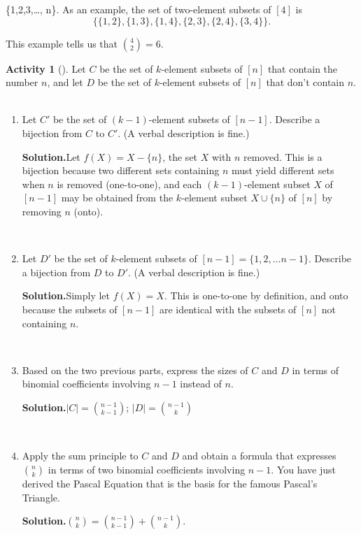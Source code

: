 \documentclass[10pt,]{book}
\theoremstyle{plain}
\theoremstyle{definition}
\newtheorem{activity}[project]{Activity}
\numberwithin{equation}{chapter}
\begin{document}
\{1,2,3,\ldots, n\}\). As an example, the set of two-element subsets of \([4]\) is%
\begin{equation*}
\{\{1,2\}, \{1,3\}, \{1,4\}, \{2,3\}, \{2,4\}, \{3,4\}\}.
\end{equation*}
%
\par
This example tells us that \(\binom{4}{2} = 6\).%
\begin{activity}[]\label{Pascal}
Let \(C\) be the set of \(k\)-element subsets of \([n]\) that contain the number \(n\), and let \(D\) be the set of \(k\)-element subsets of \([n]\) that don't contain \(n\).%
~\par
\begin{enumerate}[label=(\alph*)]
 \item Let \(C'\) be the set of \((k-1)\)-element subsets of \([n-1]\).  Describe a bijection from \(C\) to \(C'\).  (A verbal description is fine.)%
\par\medskip\noindent%
\textbf{Solution.}\quad Let \(f(X) = X-\{n\}\), the set \(X\) with \(n\) removed. This is a bijection because two different sets containing \(n\) must yield different sets when \(n\) is removed (one-to-one), and each \((k-1)\)-element subset \(X\) of \([n-1]\) may be obtained from the \(k\)-element subset \(X\cup \{n\}\) of \([n]\) by removing \(n\) (onto).%

~\par
\item Let \(D'\) be the set of \(k\)-element subsets of \([n-1]=\{1,2,\ldots n-1\}\).  Describe a bijection from \(D\) to \(D'\). (A verbal description is fine.)%
\par\medskip\noindent%
\textbf{Solution.}\quad Simply let \(f(X) =X\). This is one-to-one by definition, and onto because the subsets of \([n-1]\) are identical with the subsets of \([n]\) not containing \(n\).%

~\par
\item Based on the two previous parts, express the sizes of \(C\) and \(D\) in terms of binomial coefficients involving \(n-1\) instead of \(n\).%
\par\medskip\noindent%
\textbf{Solution.}\quad \(|C|= \binom{n-1}{k-1}\); \(|D| = \binom{n-1}{k}\)%

~\par
\item Apply the sum principle to \(C\) and \(D\) and obtain a formula that expresses \(\binom{n}{k}\) in terms of two binomial coefficients involving \(n-1\).  You have just derived the Pascal Equation that is the basis for the famous Pascal's Triangle.%
\par\medskip\noindent%
\textbf{Solution.}\quad \(\binom{n}{k} = \binom{n-1}{k-1} +\binom{n-1}{k}\).%

\end{enumerate}
\end{activity}
\typeout{************************************************}
\typeout{************************************************}
\end{document}
